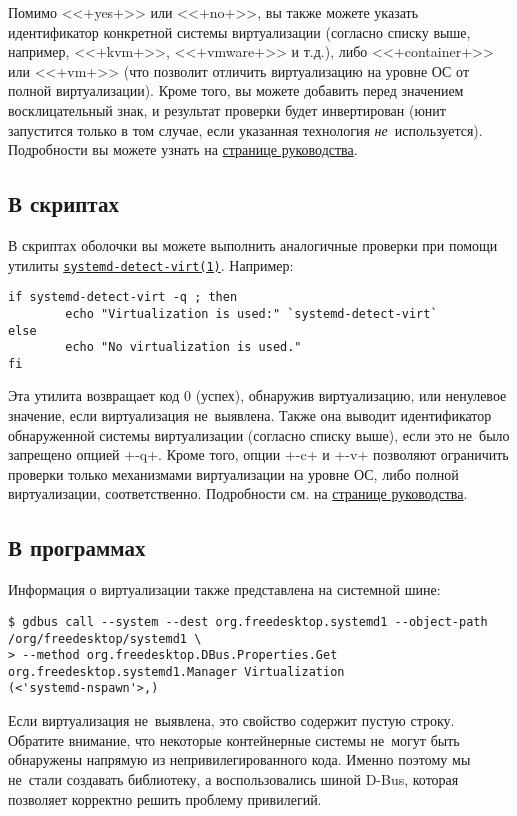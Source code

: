 \documentclass[10pt,oneside,a4paper]{article}
\newcommand{\hreftt}[2]{\href{#1}{\texttt{#2}}}
\begin{document}
Помимо <<+yes+>> или <<+no+>>, вы также можете указать идентификатор конкретной
системы виртуализации (согласно списку выше, например, <<+kvm+>>, <<+vmware+>> и
т.д.), либо <<+container+>> или <<+vm+>> (что позволит отличить виртуализацию на
уровне ОС от полной виртуализации). Кроме того, вы можете добавить перед
значением восклицательный знак, и результат проверки будет инвертирован (юнит
запустится только в том случае, если указанная технология
\emph{не}~используется). Подробности вы можете узнать на
\href{http://www.freedesktop.org/software/systemd/man/systemd.unit.html}{странице
руководства}.

\subsection{В скриптах}

В скриптах оболочки вы можете выполнить аналогичные проверки при помощи утилиты
\hreftt{http://www.freedesktop.org/software/systemd/man/systemd-detect-virt.html}{systemd-detect-virt(1)}.
Например:
\begin{Verbatim}
if systemd-detect-virt -q ; then
        echo "Virtualization is used:" `systemd-detect-virt`
else
        echo "No virtualization is used."
fi
\end{Verbatim}

Эта утилита возвращает код 0 (успех), обнаружив виртуализацию, или ненулевое
значение, если виртуализация не~выявлена. Также она выводит идентификатор
обнаруженной системы виртуализации (согласно списку выше), если это не~было
запрещено опцией +-q+. Кроме того, опции +-c+ и +-v+ позволяют ограничить
проверки только механизмами виртуализации на уровне ОС, либо полной
виртуализации, соответственно. Подробности см. на
\href{http://www.freedesktop.org/software/systemd/man/systemd-detect-virt.html}{странице
руководства}.

\subsection{В программах}

Информация о виртуализации также представлена на системной шине:
\begin{Verbatim}
$ gdbus call --system --dest org.freedesktop.systemd1 --object-path /org/freedesktop/systemd1 \
> --method org.freedesktop.DBus.Properties.Get org.freedesktop.systemd1.Manager Virtualization
(<'systemd-nspawn'>,)
\end{Verbatim}

Если виртуализация не~выявлена, это свойство содержит пустую строку. Обратите
внимание, что некоторые контейнерные системы не~могут быть обнаружены напрямую
из непривилегированного кода. Именно поэтому мы не~стали создавать библиотеку, а
воспользовались шиной D-Bus, которая позволяет корректно решить проблему
привилегий.
\end{document}
